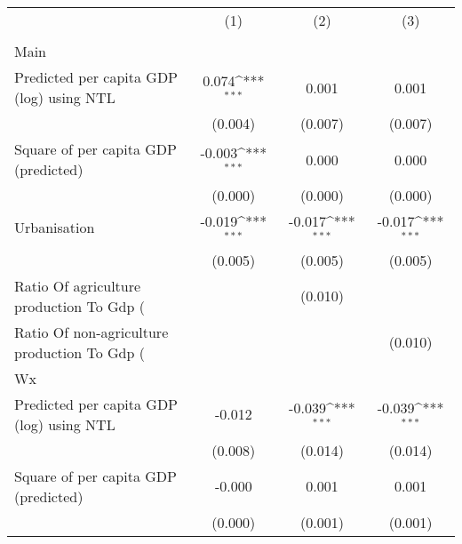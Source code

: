 {
\def\sym#1{\ifmmode^{#1}\else\(^{#1}\)\fi}
\begin{tabular}{l*{3}{c}}
\hline\hline
                    &\multicolumn{1}{c}{(1)}&\multicolumn{1}{c}{(2)}&\multicolumn{1}{c}{(3)}\\
                    &\multicolumn{1}{c}{ }&\multicolumn{1}{c}{ }&\multicolumn{1}{c}{ }\\
\hline
Main                &                     &                     &                     \\
Predicted per capita GDP (log) using NTL&       0.074\sym{***}&       0.001         &       0.001         \\
                    &     (0.004)         &     (0.007)         &     (0.007)         \\
[1em]
Square of per capita GDP (predicted)&      -0.003\sym{***}&       0.000         &       0.000         \\
                    &     (0.000)         &     (0.000)         &     (0.000)         \\
[1em]
Urbanisation        &      -0.019\sym{***}&      -0.017\sym{***}&      -0.017\sym{***}\\
                    &     (0.005)         &     (0.005)         &     (0.005)         \\
[1em]
Ratio Of agriculture production To Gdp (%
                    &                     &     (0.010)         &                     \\
[1em]
Ratio Of non-agriculture production To Gdp (%
                    &                     &                     &     (0.010)         \\
\hline
Wx                  &                     &                     &                     \\
Predicted per capita GDP (log) using NTL&      -0.012         &      -0.039\sym{***}&      -0.039\sym{***}\\
                    &     (0.008)         &     (0.014)         &     (0.014)         \\
[1em]
Square of per capita GDP (predicted)&      -0.000         &       0.001         &       0.001         \\
                    &     (0.000)         &     (0.001)         &     (0.001)         \\

\end{tabular}}
